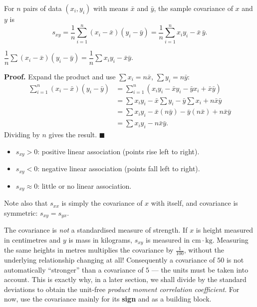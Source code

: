 \documentclass[11pt]{article}
\newcommand{\cle}[1]{{\popxbold\color{popdark}#1}}
\begin{document}
\begin{definition}
For $n$ pairs of data $(x_i,y_i)$ with means $\bar{x}$ and $\bar{y}$, the \cle{sample covariance} of $x$ and $y$ is
\[ s_{xy}=\frac{1}{n}\sum_{i=1}^{n}(x_i-\bar{x})(y_i-\bar{y})=\frac{1}{n}\sum_{i=1}^{n}x_iy_i-\bar{x}\,\bar{y}. \]
\end{definition}

\begin{propriete}
$\dfrac{1}{n}\sum (x_i-\bar{x})(y_i-\bar{y})=\dfrac{1}{n}\sum x_iy_i-\bar{x}\bar{y}$.
\end{propriete}

\textbf{Proof.} Expand the product and use $\sum x_i=n\bar{x}$, $\sum y_i=n\bar{y}$:
\begin{align*}
\sum_{i=1}^{n}(x_i-\bar{x})(y_i-\bar{y})&=\sum_{i=1}^{n}\left(x_iy_i-\bar{x}y_i-\bar{y}x_i+\bar{x}\bar{y}\right)\\
&=\sum x_iy_i-\bar{x}\sum y_i-\bar{y}\sum x_i+n\bar{x}\bar{y}\\
&=\sum x_iy_i-\bar{x}(n\bar{y})-\bar{y}(n\bar{x})+n\bar{x}\bar{y}\\
&=\sum x_iy_i-n\bar{x}\bar{y}.
\end{align*}
Dividing by $n$ gives the result. $\blacksquare$

\begin{aretenir}
\begin{itemize}
\item $s_{xy}>0$: positive linear association (points rise left to right).
\item $s_{xy}<0$: negative linear association (points fall left to right).
\item $s_{xy}\approx 0$: little or no linear association.
\end{itemize}
Note also that $s_{xx}$ is simply the covariance of $x$ with itself, and covariance is symmetric: $s_{xy}=s_{yx}$.
\end{aretenir}

\begin{attention}
The covariance is \emph{not} a standardised measure of strength. If $x$ is height measured in centimetres and $y$ is mass in kilograms, $s_{xy}$ is measured in $\mathrm{cm}\cdot\mathrm{kg}$. Measuring the same heights in metres multiplies the covariance by $\tfrac{1}{100}$, without the underlying relationship changing at all! Consequently a covariance of $50$ is not automatically ``stronger'' than a covariance of $5$ — the units must be taken into account. This is exactly why, in a later section, we shall divide by the standard deviations to obtain the unit-free \emph{product moment correlation coefficient}. For now, use the covariance mainly for its \textbf{sign} and as a building block.
\end{attention}
\end{document}
